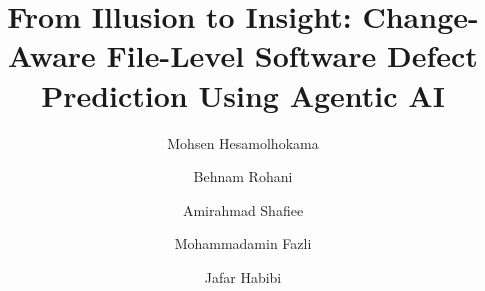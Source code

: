 \documentclass[authoryear,final,5p,times,twocolumn]{elsarticle}
\theoremstyle{plain}
\begin{document}
\begin{frontmatter}



\title{From Illusion to Insight: Change-Aware File-Level Software Defect Prediction Using Agentic AI}


\author[mce]{Mohsen Hesamolhokama}

\author[math]{Behnam Rohani}

\author[math]{Amirahmad Shafiee}

\author[mce]{Mohammadamin Fazli}

\author[mce]{Jafar Habibi}

\address[mce]{Department of Computer Engineering, Sharif University of Technology, Tehran, Iran}
\address[math]{Department of Mathematical Sciences, Sharif University of Technology, Tehran, Iran}



\end{frontmatter}
\end{document}
